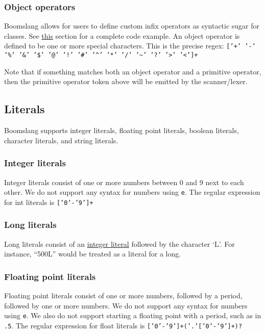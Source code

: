 \documentclass{article}
\begin{document}
\subsubsection{Object operators}
Boomslang allows for users to define custom infix operators as syntactic sugar for classes. See \hyperref[sec:object-operators]{this} section for a complete code example. An object operator is defined to be one or more special characters. This is the precise regex: \texttt{['+' '-' '\%' '\&' '\$' '@' '!' '\#' '\^{}' '*' '/' '\~{}' '?' '}\texttt{>}\texttt{' '}\texttt{<}\texttt{']+}

Note that if something matches both an object operator and a primitive operator, then the primitive operator token above will be emitted by the scanner/lexer.

\subsection{Literals}
Boomslang supports integer literals, floating point literals, boolean literals, character literals, and string literals.

\subsubsection{Integer literals}
\label{sec:intliterals}
Integer literals consist of one or more numbers between 0 and 9 next to each other. We do not support any syntax for numbers using \texttt{e}. The regular expression for int literals is \texttt{['0'-'9']+}

\subsubsection{Long literals}
\label{sec:longliterals}
Long literals consist of an \hyperref[sec:intliterals]{integer literal} followed by the character `L'. For instance, ``500L'' would be treated as a literal for a long.

\subsubsection{Floating point literals}
Floating point literals consist of one or more numbers, followed by a period, followed by one or more numbers. We do not support any syntax for numbers using \texttt{e}. We also do not support starting a floating point with a period, such as in \texttt{.5}. The regular expression for float literals is \texttt{['0'-'9']+('.'['0'-'9']+)?}
\end{document}
